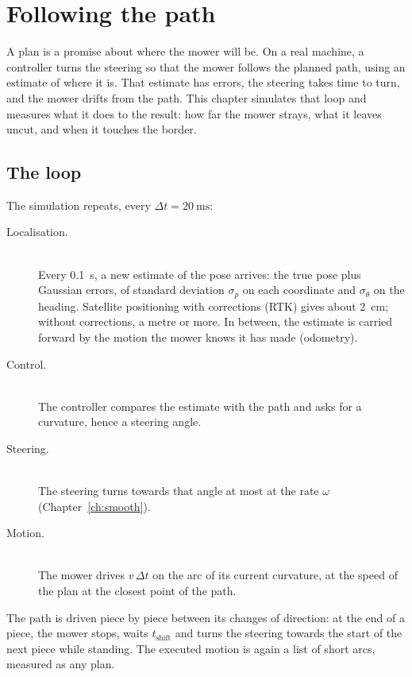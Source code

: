 \chapter{Following the path}
\label{ch:following}

A plan is a promise about where the mower will be. On a real machine, a
controller turns the steering so that the mower follows the planned path,
using an estimate of where it is. That estimate has errors, the steering
takes time to turn, and the mower drifts from the path. This chapter
simulates that loop and measures what it does to the result: how far the
mower strays, what it leaves uncut, and when it touches the border.

\section{The loop}

The simulation repeats, every $\Delta t = \SI{20}{\milli\second}$:

\begin{description}
  \item[Localisation.]
    \leavevmode\\
    Every \SI{0.1}{\second}, a new estimate of the pose arrives: the true
    pose plus Gaussian errors, of standard deviation $\sigma_p$ on each
    coordinate and $\sigma_\theta$ on the heading. Satellite positioning
    with corrections (RTK) gives about \SI{2}{\centi\metre}; without
    corrections, a metre or more. In between, the estimate is carried
    forward by the motion the mower knows it has made (odometry).
  \item[Control.]
    \leavevmode\\
    The controller compares the estimate with the path and asks for a
    curvature, hence a steering angle.
  \item[Steering.]
    \leavevmode\\
    The steering turns towards that angle at most at the rate $\omega$
    (Chapter~\ref{ch:smooth}).
  \item[Motion.]
    \leavevmode\\
    The mower drives $v\,\Delta t$ on the arc of its current curvature,
    at the speed of the plan at the closest point of the path.
\end{description}

The path is driven piece by piece between its changes of direction: at
the end of a piece, the mower stops, waits $t_{\mathrm{shift}}$ and turns
the steering towards the start of the next piece while standing. The
executed motion is again a list of short arcs, measured as any plan.

